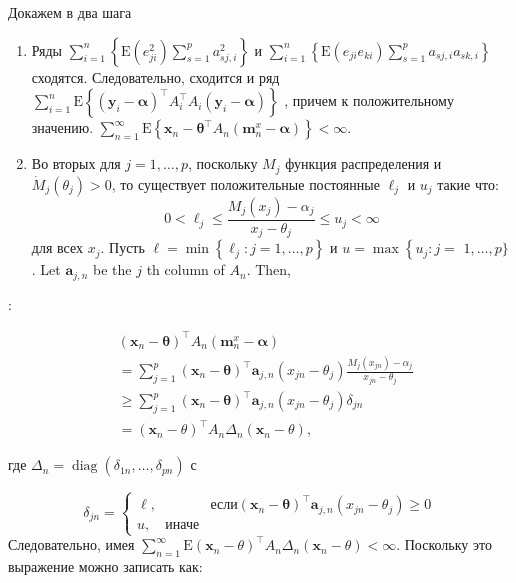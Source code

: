Докажем в два шага \begin{enumerate}
    \item Ряды $\sum_{i=1}^{n}\left\{\mathrm{E}\left(e_{j i}^{2}\right) \sum_{s=1}^{p} a_{s j, i}^{2}\right\}$ 
    и $\sum_{i=1}^{n}\left\{\mathrm{E}\left(e_{j i} e_{k i}\right) \sum_{s=1}^{p} a_{s j, i} a_{s k, i}\right\}$ 
    сходятся. Следовательно, сходится и ряд 
    $\sum_{i=1}^{n} \mathrm{E}\left\{\left(\mathbf{y}_{i}-\boldsymbol{\alpha}\right)^{\top} A_{i}^{\top} A_{i}\left(\mathbf{y}_{i}-\boldsymbol{\alpha}\right)\right\}$
    , причем к положительному значению. $\sum_{n=1}^{\infty} \mathrm{E}\left\{\mathbf{x}_{n}-\boldsymbol{\theta}^{\top} A_{n}\left(\mathbf{m}_{n}^{x}-\boldsymbol{\alpha}\right)\right\}<\infty$.
    \item Во вторых для $j=1, \ldots, p$, поскольку $M_{j}$ функция распределения и 
    $\dot{M}_{j}\left(\theta_{j}\right)>0$, то существует положительные постоянные $\ell_{j}$ и $u_{j}$ такие что:
    $$
        0<\ell_{j} \leq \frac{M_{j}\left(x_{j}\right)-\alpha_{j}}{x_{j}-\theta_{j}} \leq u_{j}<\infty
    $$
    для всех $x_{j}$. Пусть $\ell=\min \left\{\ell_{j}: j=1, \ldots, p\right\}$ и $u=\max \left\{u_{j}: j=\right.$ $1, \ldots, p\}$. Let $\mathbf{a}_{j, n}$ be the $j$ th column of $A_{n}$. Then,
\end{enumerate}:

\begin{equation}
    \begin{aligned}
        & \left(\mathbf{x}_{n}-\boldsymbol{\theta}\right)^{\top} A_{n}\left(\mathbf{m}_{n}^{x}-\boldsymbol{\alpha}\right) \\
        & =\sum_{j=1}^{p}\left(\mathbf{x}_{n}-\boldsymbol{\theta}\right)^{\top} \mathbf{a}_{j, n}\left(x_{j n}-\theta_{j}\right) \frac{M_{j}\left(x_{j n}\right)-\alpha_{j}}{x_{j n}-\theta_{j}} \\
        & \geq \sum_{j=1}^{p}\left(\mathbf{x}_{n}-\boldsymbol{\theta}\right)^{\top} \mathbf{a}_{j, n}\left(x_{j n}-\theta_{j}\right) \delta_{j n} \\
        & =\left(\mathbf{x}_{n}-\theta\right)^{\top} A_{n} \Delta_{n}\left(\mathbf{x}_{n}-\theta\right),
    \end{aligned}
\end{equation}

где $\Delta_{n}=\operatorname{diag}\left(\delta_{1 n}, \ldots, \delta_{p n}\right)$ с

\begin{equation}
    \delta_{j n}= \begin{cases}
        \ell, & \text{если} \left(\mathbf{x}_{n}-\boldsymbol{\theta}\right)^{\top} \mathbf{a}_{j, n}\left(x_{j n}-\theta_{j}\right) \geq 0  \\
        u,\quad \text{иначе}
    \end{cases}
\end{equation}
Следовательно, имея $\sum_{n=1}^{\infty} \mathrm{E}\left(\mathbf{x}_{n}-\theta\right)^{\top} A_{n} \Delta_{n}\left(\mathbf{x}_{n}-\theta\right)<\infty$. 
Поскольку это выражение можно записать как:

